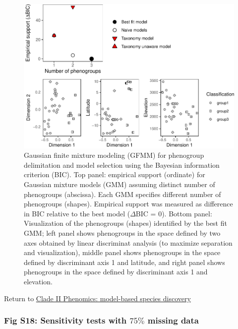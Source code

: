 \documentclass[
  11pt,
]{article}
\begin{document}
\begin{figure}
\includegraphics{Supplementary_Material_files/figure-latex/cladeIImorphologicalDelimitationPlots-1} \caption{Gaussian finite mixture modeling (GFMM) for phenogroup delimitation and model selection using the Bayesian information criterion (BIC). Top panel: empirical support (ordinate) for Gaussian mixture models (GMM) assuming distinct number of phenogroups (abscissa). Each GMM specifies different number of phenogroups (shapes). Empirical support was measured as difference in BIC relative to the best model ($\Delta$BIC = $0$). Bottom panel: Visualization of the phenogroups (shapes) identified by the best fit GMM; left panel shows phenogroups in the space defined by two axes obtained by linear discriminat analysis (to maximize separation and visualization), middle panel shows phenogroups in the space defined by discriminant axis 1 and latitude, and right panel shows phenogroups in the space defined by discriminant axis 1 and elevation.}\label{fig:cladeIImorphologicalDelimitationPlots}
\end{figure}

Return to \protect\hyperlink{model-based-species-discovery-2}{Clade II Phenomics: model-based species discovery}
\pagebreak

\hypertarget{fig-s18-sensitivity-tests-with-75-missing-data}{%
\subsubsection{\texorpdfstring{Fig S18: Sensitivity tests with \(75\%\) missing data}{Fig S18: Sensitivity tests with 75\textbackslash\% missing data}}\label{fig-s18-sensitivity-tests-with-75-missing-data}}
\end{document}
